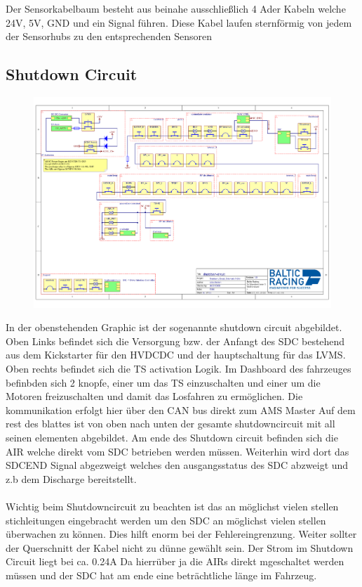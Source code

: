 Der Sensorkabelbaum besteht aus beinahe ausschließlich 4 Ader Kabeln welche 24V, 5V, GND und ein Signal führen. Diese Kabel laufen sternförmig von jedem der Sensorhubs zu den entsprechenden Sensoren

\subsection{Shutdown Circuit}
\begin{figure}[h]
	\centering
	\includegraphics[width=1\linewidth]{bilder/Shutdowncircuit}
	\caption[Shutdown Circuit Schematic]{}
	\label{fig:shutdowncircuit}
\end{figure}

In der obenstehenden Graphic ist der sogenannte shutdown circuit abgebildet. Oben Links befindet sich die Versorgung bzw. der Anfangt des SDC bestehend aus dem Kickstarter für den HVDCDC und der hauptschaltung für das LVMS. Oben rechts befindet sich die TS activation Logik. Im Dashboard des fahrzeuges befinbden sich 2 knopfe, einer um das TS einzuschalten und einer um die Motoren freizuschalten und damit das Losfahren zu ermöglichen. Die kommunikation erfolgt hier über den CAN bus direkt zum AMS Master Auf dem rest des blattes ist von oben nach unten der gesamte shutdowncircuit mit all seinen elementen abgebildet. Am ende des Shutdown circuit befinden sich die AIR welche direkt vom SDC betrieben werden müssen. Weiterhin wird dort das SDCEND Signal abgezweigt welches den ausgangsstatus des SDC abzweigt und z.b dem Discharge bereitstellt.\\
\\
Wichtig beim Shutdowncircuit zu beachten ist das an möglichst vielen stellen stichleitungen eingebracht werden um den SDC an möglichst vielen stellen überwachen zu können. Dies hilft enorm bei der Fehlereingrenzung. Weiter sollter der Querschnitt der Kabel nicht zu dünne gewählt sein. Der Strom im Shutdown Circuit liegt bei ca. 0.24A Da hierrüber ja die AIRs direkt mgeschaltet werden müssen und der SDC hat am ende eine beträchtliche länge im Fahrzeug. 

